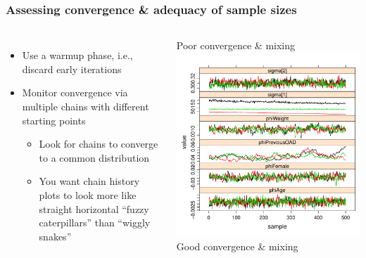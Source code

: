 \documentclass[handout]{beamer}
\begin{document}
\begin{frame}
  \frametitle{Assessing convergence \& adequacy of sample sizes}
  
\begin{columns}
\begin{itemize}
\item Use a warmup phase, i.e., discard early iterations
\item Monitor convergence via multiple chains with different starting points
\begin{itemize}
\item Look for chains to converge to a common distribution
\item You want chain history plots to look more like straight horizontal “fuzzy caterpillars” than “wiggly snakes”
\end{itemize}
\end{itemize}
\center
\vspace{-16pt}
Poor convergence \& mixing\\
\includegraphics[width=\textwidth,height=0.4\textheight]{graphics/poorConvergence.pdf}\\
\vspace{-8pt}
Good convergence \& mixing\\

\end{columns}
\end{frame}
\end{document}

